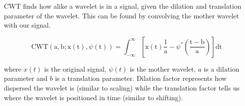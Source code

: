 \begin{enumerate}
    CWT finds how alike a wavelet is in a signal, given the dilation and translation parameter of the wavelet. 
    This can be found by convolving the mother wavelet with our signal.

    \begin{equation*} 
        \text{CWT}(\mathrm{a},\mathrm{b}; \mathrm{x}(\mathrm{t}),\psi(\mathrm{t}))=\int_{-\infty}^{\infty}[\mathrm{x}(\mathrm{t})\frac{1}{\mathrm{a}}-\psi^{*}(\frac{\mathrm{t}-\mathrm{b}}{\mathrm{a}})]\text{dt}
    \end{equation*}

    where $x(t)$ is the original signal, $\psi(t)$ is the mother wavelet, $a$ is a dilation parameter and $b$ is a translation parameter.
    Dilation factor represents how dispersed the wavelet is (similar to scaling) while the translation factor tells us where the wavelet is
    positioned in time (similar to shifting). 
    

\end{enumerate}
